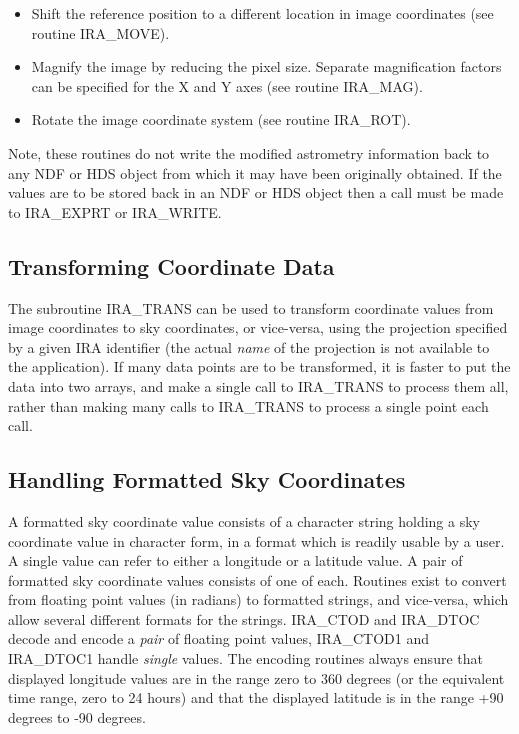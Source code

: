 \begin{itemize}
\item Shift the reference position to a different location in image coordinates
(see routine IRA\_MOVE).
\item Magnify the image by reducing the pixel size. Separate magnification 
factors can be specified for the X and Y axes (see routine IRA\_MAG).
\item Rotate the image coordinate system (see routine IRA\_ROT).
\end{itemize}

Note, these routines do not write the modified astrometry information back to 
any NDF or HDS object from which it may have been originally obtained. If the 
values are to be stored back in an NDF or HDS object then a call must be made to
IRA\_EXPRT or IRA\_WRITE.

\subsection {Transforming Coordinate Data}
The subroutine IRA\_TRANS can be used to transform coordinate values from image
coordinates to sky coordinates, or vice-versa, using the projection specified by
a given IRA identifier (the actual {\em name} of the projection is not
available to the application). If many data points are to be transformed, it is
faster to put the data into two arrays, and make a single call to IRA\_TRANS to
process them all, rather than making many calls to IRA\_TRANS to process a
single point each call. 

\subsection {Handling Formatted Sky Coordinates}
A formatted sky coordinate value consists of a character string holding a sky
coordinate value in character form, in a format which is readily usable by a
user. A single value can refer to either a longitude or a latitude value. A pair
of formatted sky coordinate values consists of one of each. Routines exist to 
convert from floating point values (in radians) to formatted strings, and
vice-versa, which allow several different formats for the strings. IRA\_CTOD and
IRA\_DTOC decode and encode a {\em pair} of floating point values, IRA\_CTOD1
and IRA\_DTOC1 handle {\em single} values. The encoding routines always ensure
that displayed longitude values are in the range zero to 360 degrees (or the
equivalent time range, zero to 24 hours) and that the displayed latitude is in
the range +90 degrees to -90 degrees. 

